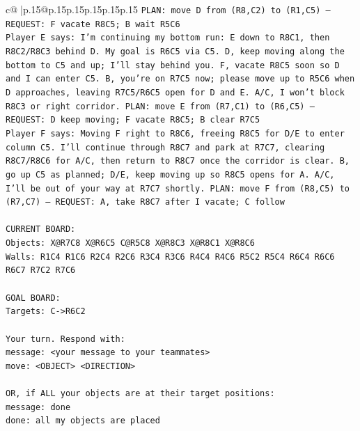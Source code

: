 \documentclass{article}
\begin{document}
{\begin{supertabular}{c@{$\;$}|p{.15\linewidth}@{}p{.15\linewidth}p{.15\linewidth}p{.15\linewidth}p{.15\linewidth}p{.15\linewidth}}
{{{\texttt{PLAN: move D from (R8,C2) to (R1,C5) — REQUEST: F vacate R8C5; B wait R5C6} \\
\texttt{Player E says: I'm continuing my bottom run: E down to R8C1, then R8C2/R8C3 behind D. My goal is R6C5 via C5. D, keep moving along the bottom to C5 and up; I'll stay behind you. F, vacate R8C5 soon so D and I can enter C5. B, you're on R7C5 now; please move up to R5C6 when D approaches, leaving R7C5/R6C5 open for D and E. A/C, I won't block R8C3 or right corridor. PLAN: move E from (R7,C1) to (R6,C5) — REQUEST: D keep moving; F vacate R8C5; B clear R7C5} \\
\texttt{Player F says: Moving F right to R8C6, freeing R8C5 for D/E to enter column C5. I’ll continue through R8C7 and park at R7C7, clearing R8C7/R8C6 for A/C, then return to R8C7 once the corridor is clear. B, go up C5 as planned; D/E, keep moving up so R8C5 opens for A. A/C, I’ll be out of your way at R7C7 shortly. PLAN: move F from (R8,C5) to (R7,C7) — REQUEST: A, take R8C7 after I vacate; C follow} \\
\\ 
\texttt{CURRENT BOARD:} \\
\texttt{Objects: X@R7C8 X@R6C5 C@R5C8 X@R8C3 X@R8C1 X@R8C6} \\
\texttt{Walls: R1C4 R1C6 R2C4 R2C6 R3C4 R3C6 R4C4 R4C6 R5C2 R5C4 R6C4 R6C6 R6C7 R7C2 R7C6} \\
\\ 
\texttt{GOAL BOARD:} \\
\texttt{Targets: C{-}>R6C2} \\
\\ 
\texttt{Your turn. Respond with:} \\
\texttt{message: <your message to your teammates>} \\
\texttt{move: <OBJECT> <DIRECTION>} \\
\\ 
\texttt{OR, if ALL your objects are at their target positions:} \\
\texttt{message: done} \\
\texttt{done: all my objects are placed} \\
            }
        }
    }
     \\ \\


\end{supertabular}}
\end{document}
